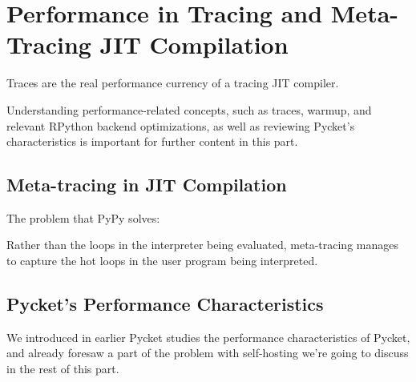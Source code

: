 \chapter{Performance in Tracing and Meta-Tracing JIT Compilation}

    \begin{mainpoint}
        Traces are the real performance currency of a tracing JIT compiler.

        Understanding performance-related concepts, such as traces, warmup, and relevant RPython backend optimizations, as well as reviewing Pycket's characteristics is important for further content in this part.
    \end{mainpoint}

    \section{Meta-tracing in JIT Compilation}
        \begin{mainpoint}
            The problem that PyPy solves:

            Rather than the loops in the interpreter being evaluated, meta-tracing manages to capture the hot loops in the user program being interpreted.
        \end{mainpoint}

    \section{Pycket's Performance Characteristics}
        \begin{mainpoint}
            We introduced in earlier Pycket studies the performance characteristics of Pycket, and already foresaw a part of the problem with self-hosting we're going to discuss in the rest of this part.
        \end{mainpoint}


